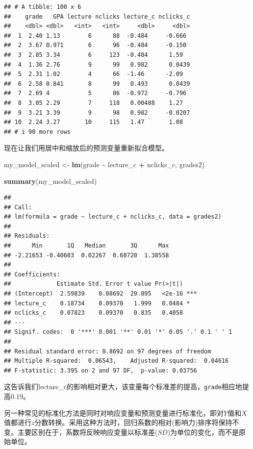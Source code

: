 \documentclass[
]{book}
\newenvironment{Shaded}{\begin{snugshade}}{\end{snugshade}}
\newcommand{\FunctionTok}[1]{\textcolor[rgb]{0.13,0.29,0.53}{\textbf{#1}}}
\newcommand{\NormalTok}[1]{#1}
\newcommand{\OtherTok}[1]{\textcolor[rgb]{0.56,0.35,0.01}{#1}}
\newcommand{\SpecialCharTok}[1]{\textcolor[rgb]{0.81,0.36,0.00}{\textbf{#1}}}
\begin{document}
\begin{verbatim}
## # A tibble: 100 x 6
##    grade   GPA lecture nclicks lecture_c nclicks_c
##    <dbl> <dbl>   <int>   <int>     <dbl>     <dbl>
##  1  2.40 1.13        6      88  -0.484     -0.666 
##  2  3.67 0.971       6      96  -0.484     -0.150 
##  3  2.85 3.34        6     123  -0.484      1.59  
##  4  1.36 2.76        9      99   0.982      0.0439
##  5  2.31 1.02        4      66  -1.46      -2.09  
##  6  2.58 0.841       8      99   0.493      0.0439
##  7  2.69 4           5      86  -0.972     -0.796 
##  8  3.05 2.29        7     118   0.00488    1.27  
##  9  3.21 3.39        9      98   0.982     -0.0207
## 10  2.24 3.27       10     115   1.47       1.08  
## # i 90 more rows
\end{verbatim}

现在让我们用居中和缩放后的预测变量重新拟合模型。

\begin{Shaded}
\begin{Highlighting}[]
\NormalTok{my\_model\_scaled }\OtherTok{\textless{}{-}} \FunctionTok{lm}\NormalTok{(grade }\SpecialCharTok{\textasciitilde{}}\NormalTok{ lecture\_c }\SpecialCharTok{+}\NormalTok{ nclicks\_c, grades2)}

\FunctionTok{summary}\NormalTok{(my\_model\_scaled)}
\end{Highlighting}
\end{Shaded}

\begin{verbatim}
## 
## Call:
## lm(formula = grade ~ lecture_c + nclicks_c, data = grades2)
## 
## Residuals:
##      Min       1Q   Median       3Q      Max 
## -2.21653 -0.40603  0.02267  0.60720  1.38558 
## 
## Coefficients:
##             Estimate Std. Error t value Pr(>|t|)    
## (Intercept)  2.59839    0.08692  29.895   <2e-16 ***
## lecture_c    0.18734    0.09370   1.999   0.0484 *  
## nclicks_c    0.07823    0.09370   0.835   0.4058    
## ---
## Signif. codes:  0 '***' 0.001 '**' 0.01 '*' 0.05 '.' 0.1 ' ' 1
## 
## Residual standard error: 0.8692 on 97 degrees of freedom
## Multiple R-squared:  0.06543,    Adjusted R-squared:  0.04616 
## F-statistic: 3.395 on 2 and 97 DF,  p-value: 0.03756
\end{verbatim}

这告诉我们lecture\_c的影响相对更大，该变量每个标准差的提高，\texttt{grade}相应地提高0.19。

另一种常见的标准化方法是同时对响应变量和预测变量进行标准化，即对\(Y\)值和\(X\)值都进行\(z\)分数转换。采用这种方法时，回归系数的相对(影响力)排序将保持不变。主要区别在于，系数将反映响应变量以标准差(\(SD\))为单位的变化，而不是原始单位。
\end{document}
